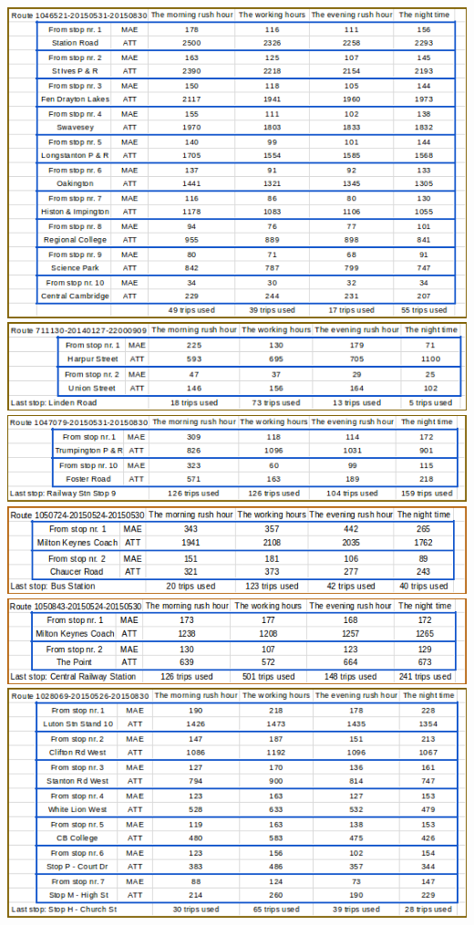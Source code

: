 \documentclass[12pt,a4paper,oneside,openright]{report}
\begin{document}
\includegraphics[width=\textwidth]{figs/table_of_1046521.png}
\includegraphics[width=\textwidth]{figs/table_of_711130.png}
\includegraphics[width=\textwidth]{figs/table_of_1047079.png}
\includegraphics[width=\textwidth]{figs/table_of_1050724.png}
\includegraphics[width=\textwidth]{figs/table_of_1050843.png}
\includegraphics[width=\textwidth]{figs/table_of_1028069.png}
\end{document}
